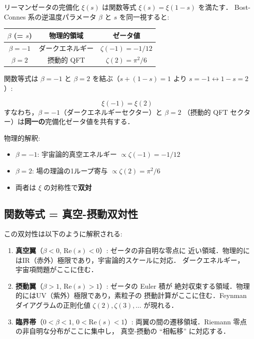 リーマンゼータの完備化 $\xi(s)$ は関数等式 $\xi(s) = \xi(1-s)$ を満たす．
Bost-Connes 系の逆温度パラメータ $\beta$ と $s$ を同一視すると:

\begin{center}
\begin{tabular}{ccc}
\toprule
$\beta$ (= $s$) & 物理的領域 & ゼータ値 \\
\midrule
$\beta = -1$ & ダークエネルギー & $\zeta(-1) = -1/12$ \\
$\beta = 2$ & 摂動的 QFT & $\zeta(2) = \pi^2/6$ \\
\bottomrule
\end{tabular}
\end{center}

関数等式は $\beta = -1$ と $\beta = 2$ を結ぶ（$s + (1-s) = 1$ より
$s = -1 \leftrightarrow 1-s = 2$）:

\begin{keyresult}[関数等式双対性]
\begin{equation}
\xi(-1) = \xi(2)
\end{equation}
すなわち，$\beta = -1$（ダークエネルギーセクター）と $\beta = 2$
（摂動的 QFT セクター）は\textbf{同一の}完備化ゼータ値を共有する．

物理的解釈:
\begin{itemize}
\item $\beta = -1$: 宇宙論的真空エネルギー $\propto \zeta(-1) = -1/12$
\item $\beta = 2$: 場の理論の1ループ寄与 $\propto \zeta(2) = \pi^2/6$
\item 両者は $\xi$ の対称性で\textbf{双対}
\end{itemize}
\end{keyresult}

\subsection{関数等式 = 真空-摂動双対性}

この双対性は以下のように解釈される:

\begin{enumerate}
\item \textbf{真空翼}（$\beta < 0$, Re$(s) < 0$）: ゼータの非自明な零点に
  近い領域．物理的にはIR（赤外）極限であり，宇宙論的スケールに対応．
  ダークエネルギー，宇宙項問題がここに住む．

\item \textbf{摂動翼}（$\beta > 1$, Re$(s) > 1$）: ゼータの Euler 積が
  絶対収束する領域．物理的にはUV（紫外）極限であり，素粒子の
  摂動計算がここに住む．Feynman ダイアグラムの正則化値
  $\zeta(2), \zeta(3), \ldots$ が現れる．

\item \textbf{臨界帯}（$0 < \beta < 1$, $0 < \text{Re}(s) < 1$）:
  両翼の間の遷移領域．Riemann 零点の非自明な分布がここに集中し，
  真空-摂動の ``相転移'' に対応する．
\end{enumerate}

